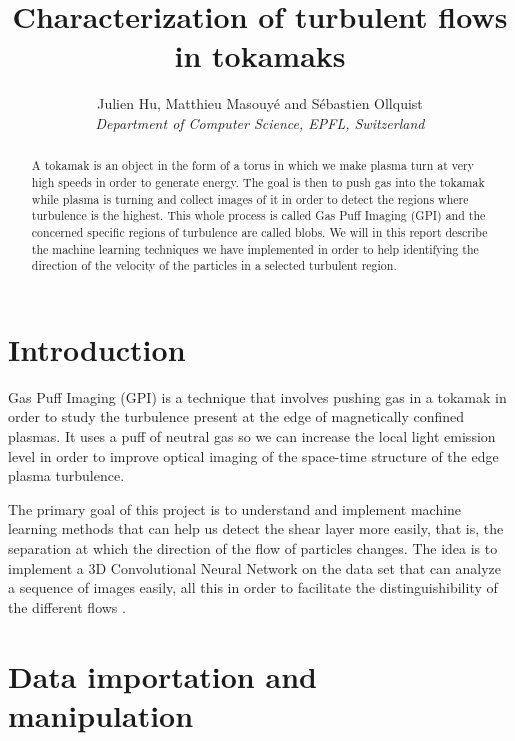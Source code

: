 \documentclass[10pt,conference]{IEEEtran}
\begin{document}
\title{Characterization of turbulent flows in tokamaks}

\author{
  Julien Hu, Matthieu Masouyé and Sébastien Ollquist\\
  \textit{Department of Computer Science, EPFL, Switzerland}
}

\maketitle

\begin{abstract}
  A tokamak is an object in the form of a torus in which we make plasma turn at very high speeds in order to generate energy. The goal is then to push gas into the tokamak while plasma is turning and collect images of it in order to detect the regions where turbulence is the highest. This whole process is called Gas Puff Imaging (GPI) and the concerned specific regions of turbulence are called blobs. We will in this report describe the machine learning techniques we have implemented in order to help identifying the direction of the velocity of the particles in a selected turbulent region.
\end{abstract}

\section{Introduction}
Gas Puff Imaging (GPI) is a technique that involves pushing gas in a tokamak in order to study the turbulence present at the edge of magnetically confined plasmas. It uses a puff of neutral gas so we can increase the local light emission level in order to improve optical imaging of the space-time structure of the edge plasma turbulence.\par
The primary goal of this project is to understand and implement machine learning methods that can help us detect the shear layer more easily, that is, the separation at which the direction of the flow of particles changes. The idea is to implement a 3D Convolutional Neural Network on the data set that can analyze a sequence of images easily, all this in order to facilitate the distinguishibility of the different flows \cite{velocitycnn}.

\section{Data importation and manipulation}
\end{document}
